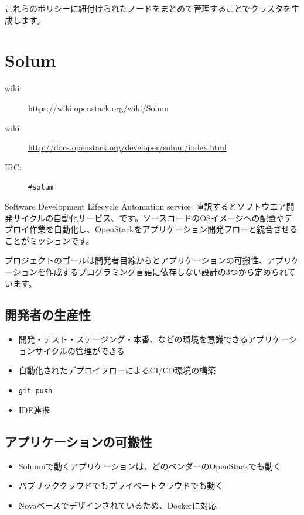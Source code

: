 これらのポリシーに紐付けられたノードをまとめて管理することでクラスタを生成します。

\section{Solum}

\begin{description}
	\item[wiki:] \url{https://wiki.openstack.org/wiki/Solum}
	\item[wiki:] \url{http://docs.openstack.org/developer/solum/index.html}
	\item[IRC:] \verb|#solum|
\end{description}

Software Development Lifecycle Automation service: 直訳するとソフトウエア開発サイクルの自動化サービス、です。ソースコードのOSイメージへの配置やデプロイ作業を自動化し、OpenStackをアプリケーション開発フローと統合させることがミッションです。

プロジェクトのゴールは開発者目線からとアプリケーションの可搬性、アプリケーションを作成するプログラミング言語に依存しない設計の3つから定められています。

\subsection*{開発者の生産性}
\begin{itemize}
	\item 開発・テスト・ステージング・本番、などの環境を意識できるアプリケーションサイクルの管理ができる
	\item 自動化されたデプロイフローによるCI/CD環境の構築
	\item \verb|git push|
	\item IDE連携
\end{itemize}

\subsection*{アプリケーションの可搬性}
\begin{itemize}
	\item Solumnで動くアプリケーションは、どのベンダーのOpenStackでも動く
	\item パブリッククラウドでもプライベートクラウドでも動く
	\item Novaベースでデザインされているため、Dockerに対応
\end{itemize}

